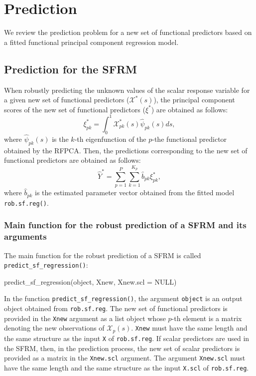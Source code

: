 \section{Prediction}

We review the prediction problem for a new set of functional predictors based on a fitted functional principal component regression model.

\subsection*{Prediction for the SFRM}

When robustly predicting the unknown values of the scalar response variable for a given new set of functional predictors ($\mathcal{X}^*(s)$), the principal component scores of the new set of functional predictors ($\xi^*$) are obtained as follows:
\begin{equation*}
\xi_{pk}^* = \int_0^1 \mathcal{X}^*_{pk}(s) \widehat{\psi}_{pk}(s) ds,
\end{equation*}
where $\widehat{\psi}_{pk}(s)$ is the $k$-th eigenfunction of the $p$-the functional predictor obtained by the RFPCA. Then, the predictions corresponding to the new set of functional predictors are obtained as follows:
\begin{equation*}
\widehat{Y}^* = \sum_{p=1}^P \sum_{k=1}^{K_p} \widehat{b}_{pk} \xi_{pk}^*,
\end{equation*}
where $\widehat{b}_{pk}$ is the estimated parameter vector obtained from the fitted model \texttt{rob.sf.reg()}.

\subsubsection*{Main function for the robust prediction of a SFRM and its arguments}

The main function for the robust prediction of a SFRM is called \texttt{predict\_sf\_regression()}:
\begin{smallexample}
\begin{smallverbatim}
predict_sf_regression(object, Xnew, Xnew.scl = NULL)
\end{smallverbatim}
\end{smallexample}
In the function \texttt{predict\_sf\_regression()}, the argument \texttt{object} is an output object obtained from \texttt{rob.sf.reg}. The new set of functional predictors is provided in the \texttt{Xnew} argument as a list object whose $p$-th element is a matrix denoting the new observations of $\mathcal{X}_p(s)$. \texttt{Xnew} must have the same length and the same structure as the input \texttt{X} of \texttt{rob.sf.reg}. If scalar predictors are used in the SFRM, then, in the prediction process, the new set of scalar predictors is provided as a matrix in the \texttt{Xnew.scl} argument. The argument
\texttt{Xnew.scl} must have the same length and the same structure as the input \texttt{X.scl} of \texttt{rob.sf.reg}.

